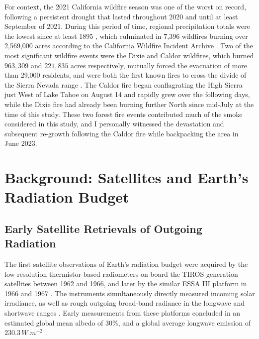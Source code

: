 \documentclass[12pt]{article}
\begin{document}
    For context, the 2021 California wildfire season was one of the worst on record, following a persistent drought that lasted throughout 2020 and until at least September of 2021. During this period of time, regional precipitation totals were the lowest since at least 1895 \cite{mankin_noaa_2021}, which culminated in 7,396 wildfires burning over 2,569,000 acres according to the California Wildfire Incident Archive \cite{the_department_of_forestry_and_fire_protection_2021_nodate}. Two of the most significant wildfire events were the Dixie and Caldor wildfires, which burned $963,309$ and $221,835$ acres respectively, mutually forced the evacuation of more than 29,000 residents, and were both the first known fires to cross the divide of the Sierra Nevada range \cite{chan_unprecedented_2021}\cite{the_department_of_forestry_and_fire_protection_2021_nodate}. The Caldor fire began conflagrating the High Sierra just West of Lake Tahoe on August 14 and rapidly grew over the following days, while the Dixie fire had already been burning further North since mid-July at the time of this study. These two forest fire events contributed much of the smoke considered in this study, and I personally witnessed the devastation and subsequent re-growth following the Caldor fire while backpacking the area in June 2023.


\section{Background: Satellites and Earth's Radiation Budget}

    \subsection{Early Satellite Retrievals of Outgoing Radiation}

    The first satellite observations of Earth's radiation budget were acquired by the low-resolution thermistor-based radiometers on board the TIROS-generation satellites between 1962 and 1966, and later by the similar ESSA III platform in 1966 and 1967 \cite{haar_measurements_1971}\cite{suomi_theoretical_1967}. The instruments simultaneously directly measured incoming solar irradiance, as well as rough outgoing broad-band radiance in the longwave and shortwave ranges \cite{house_radiation_1965}\cite{bartko_tiros_1964}. Early measurements from these platforms concluded in an estimated global mean albedo of $30\%$, and a global average longwave emission of $230.3\,\si{W.m^{-2}}$ \cite{house_radiation_1965}\cite{vonder_haar_satellite_1969}.
\end{document}
